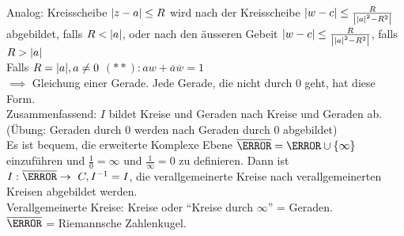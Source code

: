 Analog: Kreisscheibe $\abs{z-a} \leq R$ wird nach der Kreisscheibe $\abs{w-c} \leq \frac{R}{\abs{\abs{a}^2 - R^2}}$ abgebildet, falls $R < \abs{a}$, oder nach den äusseren Gebeit $\abs{w-c} \leq \frac{R}{\abs{\abs{a}^2 - R^2}}$, falls $R > \abs{a}$ \\
Falls $R = \abs{a} , a \neq 0$
$(**): aw + \overline{a}\overline{w} = 1$ \\
$\implies$ Gleichung einer Gerade. Jede Gerade, die nicht durch $0$ geht, hat diese Form. \\
Zusammenfassend: $I$ bildet Kreise und Geraden nach Kreise und Geraden ab. (Übung: Geraden durch $0$ werden nach Geraden durch $0$ abgebildet) \\
Es ist bequem, die erweiterte Komplexe Ebene $\overline{\C} = \C \cup \{\infty\}$ einzuführen und $\frac{1}{0} = \infty$ und $\frac{1}{\infty} = 0$ zu definieren. Dann ist $I : \overline{\C} \rightarrow C , I^{-1} = I$, die verallgemeinerte Kreise nach verallgemeinerten Kreisen abgebildet werden. \\
Verallgemeinerte Kreise: Kreise oder \enquote{Kreise durch $\infty$} = Geraden. \\
$\overline{\C}$ = Riemannsche Zahlenkugel.

